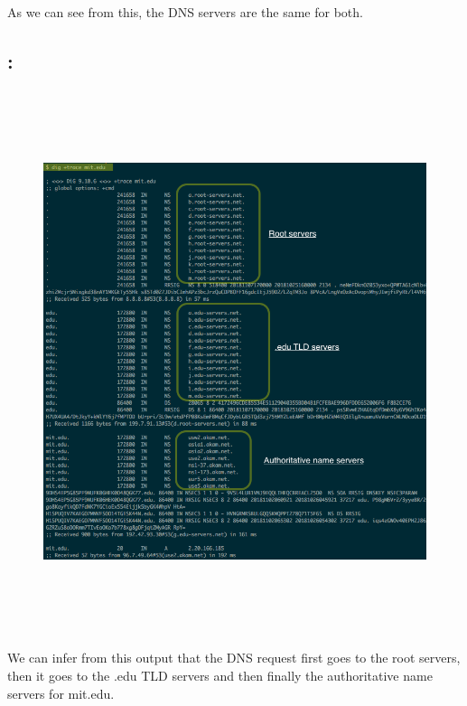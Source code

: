\documentclass[]{report}
\begin{document}
As we can see from this, the DNS servers are the same for both.
\subsection{:}
\begin{figure}[H]
	\vspace{0pt}
	\includegraphics[height = 450pt, keepaspectratio]{Snapshots/q4/4_3.png}
\end{figure}
We can infer from this output that the DNS request first goes to the root servers, then it goes to the .edu TLD servers and then finally the authoritative name servers for mit.edu. 
\end{document}
